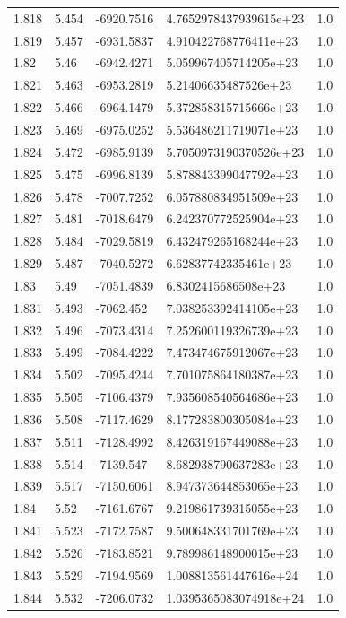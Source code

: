 \begin{tabular}{lllll}
1.818 & 5.454 & -6920.7516 & 4.7652978437939615e+23 & 1.0 \\
1.819 & 5.457 & -6931.5837 & 4.910422768776411e+23 & 1.0 \\
1.82 & 5.46 & -6942.4271 & 5.059967405714205e+23 & 1.0 \\
1.821 & 5.463 & -6953.2819 & 5.21406635487526e+23 & 1.0 \\
1.822 & 5.466 & -6964.1479 & 5.372858315715666e+23 & 1.0 \\
1.823 & 5.469 & -6975.0252 & 5.536486211719071e+23 & 1.0 \\
1.824 & 5.472 & -6985.9139 & 5.7050973190370526e+23 & 1.0 \\
1.825 & 5.475 & -6996.8139 & 5.878843399047792e+23 & 1.0 \\
1.826 & 5.478 & -7007.7252 & 6.057880834951509e+23 & 1.0 \\
1.827 & 5.481 & -7018.6479 & 6.242370772525904e+23 & 1.0 \\
1.828 & 5.484 & -7029.5819 & 6.432479265168244e+23 & 1.0 \\
1.829 & 5.487 & -7040.5272 & 6.62837742335461e+23 & 1.0 \\
1.83 & 5.49 & -7051.4839 & 6.8302415686508e+23 & 1.0 \\
1.831 & 5.493 & -7062.452 & 7.038253392414105e+23 & 1.0 \\
1.832 & 5.496 & -7073.4314 & 7.252600119326739e+23 & 1.0 \\
1.833 & 5.499 & -7084.4222 & 7.473474675912067e+23 & 1.0 \\
1.834 & 5.502 & -7095.4244 & 7.701075864180387e+23 & 1.0 \\
1.835 & 5.505 & -7106.4379 & 7.935608540564686e+23 & 1.0 \\
1.836 & 5.508 & -7117.4629 & 8.177283800305084e+23 & 1.0 \\
1.837 & 5.511 & -7128.4992 & 8.426319167449088e+23 & 1.0 \\
1.838 & 5.514 & -7139.547 & 8.682938790637283e+23 & 1.0 \\
1.839 & 5.517 & -7150.6061 & 8.947373644853065e+23 & 1.0 \\
1.84 & 5.52 & -7161.6767 & 9.219861739315055e+23 & 1.0 \\
1.841 & 5.523 & -7172.7587 & 9.500648331701769e+23 & 1.0 \\
1.842 & 5.526 & -7183.8521 & 9.789986148900015e+23 & 1.0 \\
1.843 & 5.529 & -7194.9569 & 1.008813561447616e+24 & 1.0 \\
1.844 & 5.532 & -7206.0732 & 1.0395365083074918e+24 & 1.0 \\

\end{tabular}
